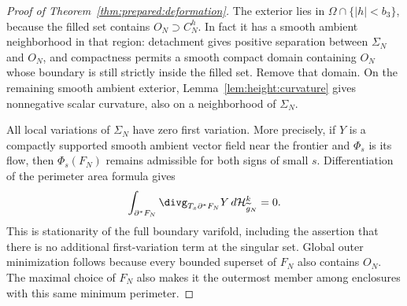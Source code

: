 \begin{proof}[Proof of Theorem~\ref{thm:prepared:deformation}]
The exterior lies in $\Omega\cap\{|h|<b_3\}$, because the filled
set contains $O_N\supset C_N^h$.  In fact it has a smooth ambient
neighborhood in that region: detachment gives positive separation
between $\Sigma_N$ and $O_N$, and compactness permits a smooth compact
domain containing $O_N$ whose boundary is still strictly inside the
filled set.  Remove that domain.  On the remaining smooth ambient
exterior, Lemma~\ref{lem:height:curvature} gives nonnegative scalar
curvature, also on a neighborhood of $\Sigma_N$.

All local variations of $\Sigma_N$ have zero first variation.  More
precisely, if $Y$ is a compactly supported smooth ambient vector field
near the frontier and $\Phi_s$ is its flow, then $\Phi_s(F_N)$ remains
admissible for both signs of small $s$.  Differentiation of the perimeter
area formula gives
\begin{equation}\label{eq:height:weak-minimality}
 \int_{\partial^*F_N}\divg_{T_x\partial^*F_N}Y\,
 d\mathcal H^k_{\widetilde g_N}=0.
\end{equation}
This is stationarity of the full boundary varifold, including the
assertion that there is no additional first-variation term at the
singular set.  Global outer minimization follows because every bounded
superset of $F_N$ also contains $O_N$.  The maximal choice of $F_N$
also makes it the outermost member among enclosures with this same
minimum perimeter.


\end{proof}
